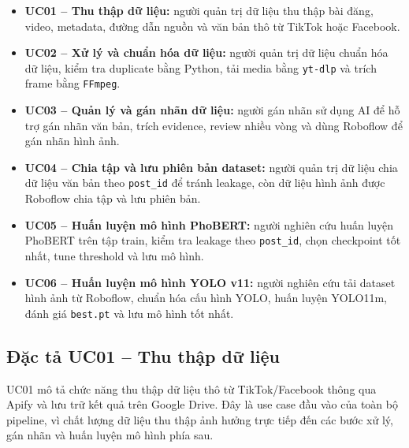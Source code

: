 \begin{itemize}
    \item \textbf{UC01 -- Thu thập dữ liệu:} người quản trị dữ liệu thu thập bài đăng, video, metadata, đường dẫn nguồn và văn bản thô từ TikTok hoặc Facebook.
    \item \textbf{UC02 -- Xử lý và chuẩn hóa dữ liệu:} người quản trị dữ liệu chuẩn hóa dữ liệu, kiểm tra duplicate bằng Python, tải media bằng \texttt{yt-dlp} và trích frame bằng \texttt{FFmpeg}.
    \item \textbf{UC03 -- Quản lý và gán nhãn dữ liệu:} người gán nhãn sử dụng AI để hỗ trợ gán nhãn văn bản, trích evidence, review nhiều vòng và dùng Roboflow để gán nhãn hình ảnh.
    \item \textbf{UC04 -- Chia tập và lưu phiên bản dataset:} người quản trị dữ liệu chia dữ liệu văn bản theo \texttt{post\_id} để tránh leakage, còn dữ liệu hình ảnh được Roboflow chia tập và lưu phiên bản.
    \item \textbf{UC05 -- Huấn luyện mô hình PhoBERT:} người nghiên cứu huấn luyện PhoBERT trên tập train, kiểm tra leakage theo \texttt{post\_id}, chọn checkpoint tốt nhất, tune threshold và lưu mô hình.
    \item \textbf{UC06 -- Huấn luyện mô hình YOLO v11:} người nghiên cứu tải dataset hình ảnh từ Roboflow, chuẩn hóa cấu hình YOLO, huấn luyện YOLO11m, đánh giá \texttt{best.pt} và lưu mô hình tốt nhất.
\end{itemize}

\subsection{Đặc tả UC01 -- Thu thập dữ liệu}
UC01 mô tả chức năng thu thập dữ liệu thô từ TikTok/Facebook thông qua Apify và lưu trữ kết quả trên Google Drive. Đây là use case đầu vào của toàn bộ pipeline, vì chất lượng dữ liệu thu thập ảnh hưởng trực tiếp đến các bước xử lý, gán nhãn và huấn luyện mô hình phía sau.

